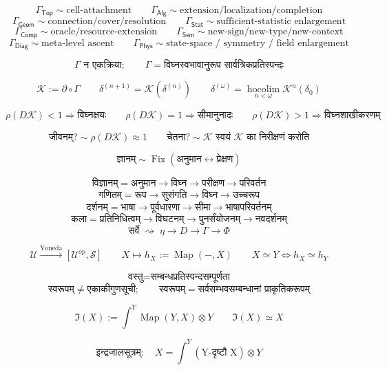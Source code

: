\documentclass{article}
\begin{document}
\[\Gamma_{\mathsf{Top}}\sim\text{cell-attachment}\qquad
\Gamma_{\mathsf{Alg}}\sim\text{extension/localization/completion}\]
\[\Gamma_{\mathsf{Geom}}\sim\text{connection/cover/resolution}\qquad
\Gamma_{\mathsf{Stat}}\sim\text{sufficient-statistic enlargement}\]
\[\Gamma_{\mathsf{Comp}}\sim\text{oracle/resource-extension}\qquad
\Gamma_{\mathsf{Sem}}\sim\text{new-sign/new-type/new-context}\]
\[\Gamma_{\mathsf{Diag}}\sim\text{meta-level ascent}\qquad
\Gamma_{\mathsf{Phys}}\sim\text{state-space / symmetry / field enlargement}\]

\[\boxed{\Gamma\text{ न एकक्रिया};\qquad
\Gamma=\text{विघ्नस्वभावानुरूप सार्वत्रिकप्रतिस्पन्दः}}\]

\[\boxed{\mathcal K:=\partial\circ\Gamma}\qquad
\delta^{(n+1)}=\mathcal K(\delta^{(n)})\qquad
\delta^{(\omega)}=\operatorname*{hocolim}_{n<\omega}\mathcal K^n(\delta_0)\]

\[\boxed{\rho(D\mathcal K)<1\Rightarrow\text{विघ्नक्षयः}}\qquad
\boxed{\rho(D\mathcal K)=1\Rightarrow\text{सीमानुनादः}}\qquad
\boxed{\rho(D\mathcal K)>1\Rightarrow\text{विघ्नशाखीकरणम्}}\]

\[\boxed{\text{जीवनम्?}\sim\rho(D\mathcal K)\approx1}\qquad
\boxed{\text{चेतना?}\sim\mathcal K\text{ स्वयं }\mathcal K\text{ का निरीक्षणं करोति}}\]

\[\boxed{\text{ज्ञानम्}\sim\operatorname{Fix}\left(\text{अनुमान}
\leftrightarrow\text{प्रेक्षण}\right)}\]

\[\boxed{\text{विज्ञानम्}=\text{अनुमान}\to\text{विघ्न}\to\text{परीक्षण}
\to\text{परिवर्तन}}\]
\[\boxed{\text{गणितम्}=\text{रूप}\to\text{सुसंगति}\to\text{विघ्न}
\to\text{उच्चरूप}}\]
\[\boxed{\text{दर्शनम्}=\text{भाषा}\to\text{पूर्वधारणा}\to\text{सीमा}
\to\text{भाषापरिवर्तनम्}}\]
\[\boxed{\text{कला}=\text{प्रतिनिधित्वम्}\to\text{विघटनम्}
\to\text{पुनर्संयोजनम्}\to\text{नवदर्शनम्}}\]
\[\boxed{\text{सर्वे}\;\rightsquigarrow\;\eta\to D\to\Gamma\to\Phi}\]

\[\mathcal U\xrightarrow{\operatorname{Yoneda}}[\mathcal U^{op},\mathcal S]
\qquad X\mapsto h_X:=\operatorname{Map}(-,X)
\qquad\boxed{X\simeq Y\iff h_X\simeq h_Y}\]

\[\boxed{\text{वस्तु}=\text{सम्बन्धप्रतिस्पन्दसम्पूर्णता}}\]
\[\boxed{\text{स्वरूपम्}\neq\text{एकाकीगुणसूची};\qquad
\text{स्वरूपम्}=\text{सर्वसम्भवसम्बन्धानां प्राकृतिकरूपम्}}\]

\[\mathfrak I(X):=\int^{Y}\operatorname{Map}(Y,X)\otimes Y
\qquad\boxed{\mathfrak I(X)\simeq X}\]

\[\boxed{\text{इन्द्रजालसूत्रम्}:\quad X=\int^{Y}(\text{Y-दृष्टौ X})\otimes Y}\]
\end{document}
